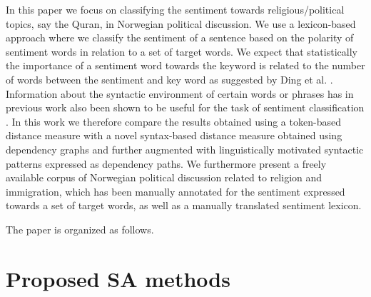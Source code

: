 \documentclass[11pt]{article}
\begin{document}
In this paper we focus on classifying the sentiment towards
religious/political topics, say the Quran, in Norwegian political
discussion. We use a lexicon-based approach where we classify the
sentiment of a sentence based on the polarity of sentiment words in
relation to a set of target words. We expect that statistically the
importance of a sentiment word towards the keyword is related to the
number of words between the sentiment and key word as suggested by
Ding et al. .  Information about the syntactic
environment of certain words or phrases has in previous work also been
shown to be useful for the task of sentiment classification
\cite{Wil:Wie:Hof:09,Jiang11}. In this work we therefore compare the
results obtained using a token-based distance measure with a novel
syntax-based distance measure obtained using dependency graphs and
further augmented with linguistically motivated syntactic patterns
expressed as dependency paths.  We furthermore present a freely
available corpus of Norwegian political discussion related to religion
and immigration, which has been manually annotated for the sentiment
expressed towards a set of target words, as well as a manually translated sentiment lexicon.


The paper is organized as follows. 

\section{Proposed SA methods}
\label{sec:om}
\end{document}

